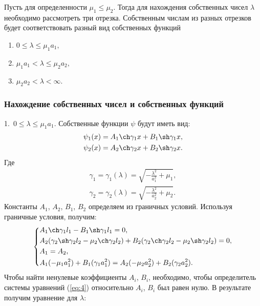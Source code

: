 \documentclass[12pt, a4paper, draft]{article}
\begin{document}
Пусть для определенности $\mu_1 \le \mu_2$. Тогда для нахождения собственных чисел $\lambda$ необходимо рассмотреть три отрезка. Собственным числам из разных отрезков будет соответствовать разный вид собственных функций
\begin{enumerate}
  \item $ 0 \le \lambda \le \mu_1a_1, $
  \item $ \mu_1a_1 < \lambda \le \mu_2a_2, $
  \item $ \mu_2a_2 < \lambda < \infty. $
\end{enumerate}
\subsubsection{Нахождение собственных чисел и собственных функций}
1.\ $ 0 \le \lambda \le \mu_1a_1$. Собственные функции $\psi$ будут иметь вид:
\begin{equation}
  \begin{aligned}
    \psi_1(x) = A_1 \ch \gamma_1x + B_1 \sh \gamma_1x, \\
    \psi_2(x) = A_2 \ch \gamma_2x + B_2 \sh \gamma_2x.
  \end{aligned}
  \label{eq:5}
\end{equation}
Где 
\begin{equation}
  \begin{aligned}
    \gamma_1 = \gamma_1(\lambda) = \sqrt{- \frac{\lambda^2}{a_1^2} + \mu_1}, \\
    \gamma_2 = \gamma_2(\lambda) = \sqrt{- \frac{\lambda^2}{a_2^2} + \mu_2}.
  \end{aligned}
\end{equation}
Константы $A_1$, $A_2$, $B_1$, $B_2$ определяем из граничных условий. Используя граничные условия, получим:
\begin{equation}
  \left\{  
  \begin{aligned}
    & A_1 \ch \gamma_1l_1 - B_1 \sh \gamma_1l_1 = 0, \\
    & A_2 (\gamma_2\sh \gamma_2l_2 - \mu_2\ch \gamma_2l_2) + B_2 (\gamma_2\ch \gamma_2l_2 - \mu_2\sh \gamma_2l_2) = 0, \\
    & A_1 = A_2, \\
    & A_1 (-\mu_1a_1^2) + B_1 (\gamma_1a_1^2) = A_2 (-\mu_2a_2^2) + B_2 (\gamma_2a_2^2).
  \end{aligned}
  \right.
  \label{eq:4}
\end{equation}
Чтобы найти ненулевые коэффициенты $A_i$, $B_i$, необходимо, чтобы определитель системы уравнений (\ref{eq:4}) относительно $A_i$, $B_i$ был равен нулю. В результате получим уравнение для $\lambda$:
\end{document}
